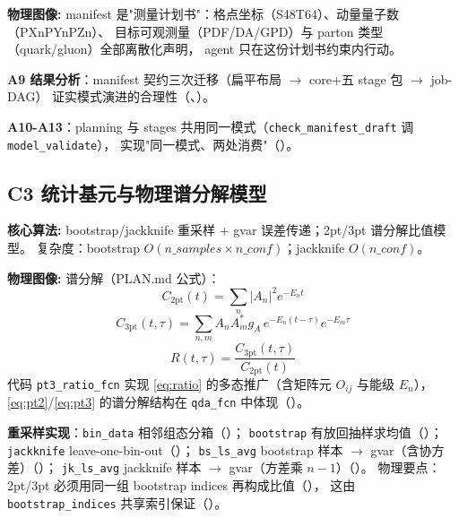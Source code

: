 \documentclass[UTF8]{ctexart}
\begin{document}
\begin{physbox}
\textbf{物理图像:} manifest 是"测量计划书"：格点坐标（S48T64）、动量量子数（PXnPYnPZn）、
目标可观测量（PDF/DA/GPD）与 parton 类型（quark/gluon）全部离散化声明，
agent 只在这份计划书约束内行动。
\end{physbox}

\textbf{A9 结果分析}：manifest 契约三次迁移（扁平布局 $\to$ core+五 stage 包 $\to$ job-DAG）
证实模式演进的合理性（\texttt{}、\texttt{}）。

\textbf{A10-A13}：planning 与 stages 共用同一模式（\texttt{check\_manifest\_draft} 调 \texttt{model\_validate}），
实现"同一模式、两处消费"（\texttt{}）。

\subsection{C3 统计基元与物理谱分解模型}

\begin{algobox}
\textbf{核心算法:} bootstrap/jackknife 重采样 + gvar 误差传递；2pt/3pt 谱分解比值模型。
复杂度：bootstrap $O(n\_samples \times n\_conf)$；jackknife $O(n\_conf)$。
\end{algobox}

\begin{physbox}
\textbf{物理图像:} 谱分解（PLAN.md 公式）：
\begin{equation}\label{eq:pt2}
C_\mathrm{2pt}(t) = \sum_n |A_n|^2 e^{-E_n t}
\end{equation}
\begin{equation}\label{eq:pt3}
C_\mathrm{3pt}(t,\tau) = \sum_{n,m} A_n A_m^* g_A\, e^{-E_n(t-\tau)} e^{-E_m\tau}
\end{equation}
\begin{equation}\label{eq:ratio}
R(t,\tau) = \frac{C_\mathrm{3pt}(t,\tau)}{C_\mathrm{2pt}(t)}
\end{equation}
代码 \texttt{pt3\_ratio\_fcn} 实现 \eqref{eq:ratio} 的多态推广（含矩阵元 $O_{ij}$ 与能级 $E_n$），
\eqref{eq:pt2}/\eqref{eq:pt3} 的谱分解结构在 \texttt{qda\_fcn} 中体现（\texttt{}）。
\end{physbox}

\textbf{重采样实现}：\texttt{bin\_data} 相邻组态分箱（\texttt{}）；
\texttt{bootstrap} 有放回抽样求均值（\texttt{}）；
\texttt{jackknife} leave-one-bin-out（\texttt{}）；
\texttt{bs\_ls\_avg} bootstrap 样本 $\to$ gvar（含协方差）（\texttt{}）；
\texttt{jk\_ls\_avg} jackknife 样本 $\to$ gvar（方差乘 $n-1$）（\texttt{}）。
物理要点：2pt/3pt 必须用同一组 bootstrap indices 再构成比值（\texttt{}），
这由 \texttt{bootstrap\_indices} 共享索引保证（\texttt{}）。
\end{document}

